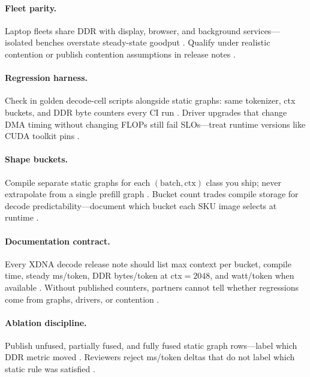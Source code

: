 \paragraph{Fleet parity.}
Laptop fleets share DDR with display, browser, and background services---isolated benches overstate steady-state goodput \citep{amd2024xdna,patel2025llminference,memoryfloor2026}.
Qualify under realistic contention or publish contention assumptions in release notes \citep{yirage2026,amd2024aie}.

\paragraph{Regression harness.}
Check in golden decode-cell scripts alongside static graphs: same tokenizer, ctx buckets, and DDR byte counters every CI run \citep{yirage2026,amd2024xdna,amd2024aie,memoryfloor2026,taxbreak2026}.
Driver upgrades that change DMA timing without changing FLOPs still fail SLOs---treat runtime versions like CUDA toolkit pins \citep{amd2024aie,patel2025llminference}.

\paragraph{Shape buckets.}
Compile separate static graphs for each $(\text{batch},\text{ctx})$ class you ship; never extrapolate from a single prefill graph \citep{amd2024xdna,amd2024aie,kwon2023vllm,patel2025llminference,yirage2026}.
Bucket count trades compile storage for decode predictability---document which bucket each SKU image selects at runtime \citep{yirage2026,amd2024xdna}.

\paragraph{Documentation contract.}
Every XDNA decode release note should list max context per bucket, compile time, steady ms/token, DDR bytes/token at ctx${=}2048$, and watt/token when available \citep{amd2024xdna,amd2024aie,patel2025llminference,yirage2026,memoryfloor2026}.
Without published counters, partners cannot tell whether regressions come from graphs, drivers, or contention \citep{chen2020compilerbasedhardw,taxbreak2026}.

\paragraph{Ablation discipline.}
Publish unfused, partially fused, and fully fused static graph rows---label which DDR metric moved \citep{memoryfloor2026,yirage2026,amd2024aie}.
Reviewers reject ms/token deltas that do not label which static rule was satisfied \citep{patel2025llminference,taxbreak2026}.

